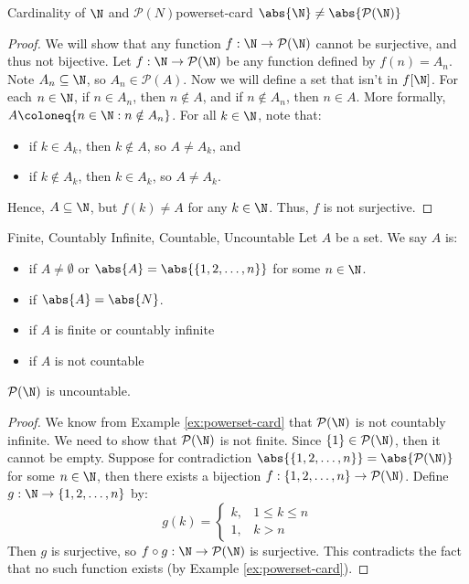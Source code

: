 \begin{exbox}{Cardinality of $\N$ and $\mathcal{P}(N)$}{powerset-card}
    $\abs{\N} \neq \abs{\mathcal{P}(\N)}$
    \tcblower
    \begin{proof}
        We will show that any function $f : \N \to \mathcal{P}(\N)$ cannot be surjective, and thus not bijective. Let $f : \N \to \mathcal{P}(\N)$ be any function defined by $f(n) = A_n$. Note $A_n \subseteq \N$, so $A_n \in \mathcal{P}(A)$. Now we will define a set that isn't in $f[\N]$. For each $n \in \N$, if $n \in A_n$, then $n \notin A$, and if $n \notin A_n$, then $n \in A$. More formally, $A \coloneq \{ n \in \N : n \notin A_n \}$. For all $k \in \N$, note that:
        \begin{itemize}[noitemsep]
            \item if $k \in A_k$, then $k \notin A$, so $A \neq A_k$, and
            \item if $k \notin A_k$, then $k \in A_k$, so $A \neq A_k$.
        \end{itemize}
        Hence, $A \subseteq \N$, but $f(k) \neq A$ for any $k \in \N$. Thus, $f$ is not surjective.
    \end{proof}
\end{exbox}

\begin{dfnbox}{Finite, Countably Infinite, Countable, Uncountable}{}
    Let $A$ be a set. We say $A$ is:
    \begin{itemize}[noitemsep]
        \item {} if $A \neq \emptyset$ or $\abs{A} = \abs{\{1, 2, \ldots, n\}}$ for some $n \in \N$.
        \item {} if $\abs{A} = \abs{N}$.
        \item {} if $A$ is finite or countably infinite
        \item {} if $A$ is not countable
    \end{itemize}
\end{dfnbox}

\begin{thmbox}{$\mathcal{P}(\N)$ is uncountable.}{}
    \begin{proof}
        We know from Example \ref{ex:powerset-card} that $\mathcal{P}(\N)$ is not countably infinite. We need to show that $\mathcal{P}(\N)$ is not finite. Since $\{1\} \in \mathcal{P}(\N)$, then it cannot be empty. Suppose for contradiction $\abs{\{1,2,\ldots,n\}} = \abs{\mathcal{P}(\N)}$ for some $n \in \N$, then there exists a bijection $f : \{1,2,\ldots,n\} \to \mathcal{P}(\N)$. Define $g : \N \to \{1,2,\ldots,n\}$ by:
        \[ g(k) = \begin{cases} k, & 1\leq k \leq n \\ 1, & k > n \end{cases} \]
        Then $g$ is surjective, so $f \circ g : \N \to \mathcal{P}(\N)$ is surjective. This contradicts the fact that no such function exists (by Example \ref{ex:powerset-card}).
    \end{proof}
\end{thmbox}

